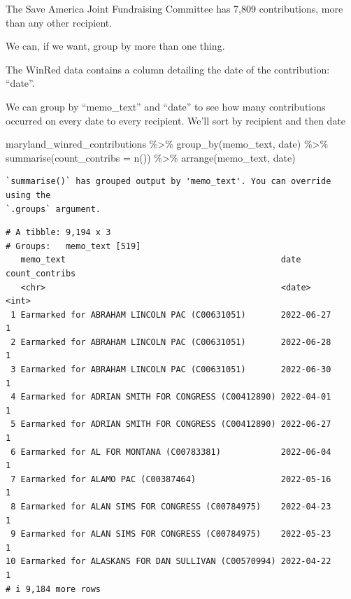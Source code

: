 \documentclass[
  letterpaper,
  DIV=11,
  numbers=noendperiod]{scrreprt}
\newenvironment{Shaded}{\begin{snugshade}}{\end{snugshade}}
\newcommand{\AttributeTok}[1]{\textcolor[rgb]{0.40,0.45,0.13}{#1}}
\newcommand{\FunctionTok}[1]{\textcolor[rgb]{0.28,0.35,0.67}{#1}}
\newcommand{\NormalTok}[1]{\textcolor[rgb]{0.00,0.23,0.31}{#1}}
\newcommand{\SpecialCharTok}[1]{\textcolor[rgb]{0.37,0.37,0.37}{#1}}
\begin{document}
The Save America Joint Fundraising Committee has 7,809 contributions,
more than any other recipient.

We can, if we want, group by more than one thing.

The WinRed data contains a column detailing the date of the
contribution: ``date''.

We can group by ``memo\_text'' and ``date'' to see how many
contributions occurred on every date to every recipient. We'll sort by
recipient and then date

\begin{Shaded}
\begin{Highlighting}[]
\NormalTok{maryland\_winred\_contributions }\SpecialCharTok{\%\textgreater{}\%}
  \FunctionTok{group\_by}\NormalTok{(memo\_text, date) }\SpecialCharTok{\%\textgreater{}\%}
  \FunctionTok{summarise}\NormalTok{(}\AttributeTok{count\_contribs =} \FunctionTok{n}\NormalTok{()) }\SpecialCharTok{\%\textgreater{}\%}
  \FunctionTok{arrange}\NormalTok{(memo\_text, date)}
\end{Highlighting}
\end{Shaded}

\begin{verbatim}
`summarise()` has grouped output by 'memo_text'. You can override using the
`.groups` argument.
\end{verbatim}

\begin{verbatim}
# A tibble: 9,194 x 3
# Groups:   memo_text [519]
   memo_text                                           date       count_contribs
   <chr>                                               <date>              <int>
 1 Earmarked for ABRAHAM LINCOLN PAC (C00631051)       2022-06-27              1
 2 Earmarked for ABRAHAM LINCOLN PAC (C00631051)       2022-06-28              1
 3 Earmarked for ABRAHAM LINCOLN PAC (C00631051)       2022-06-30              1
 4 Earmarked for ADRIAN SMITH FOR CONGRESS (C00412890) 2022-04-01              1
 5 Earmarked for ADRIAN SMITH FOR CONGRESS (C00412890) 2022-06-27              1
 6 Earmarked for AL FOR MONTANA (C00783381)            2022-06-04              1
 7 Earmarked for ALAMO PAC (C00387464)                 2022-05-16              1
 8 Earmarked for ALAN SIMS FOR CONGRESS (C00784975)    2022-04-23              1
 9 Earmarked for ALAN SIMS FOR CONGRESS (C00784975)    2022-05-23              1
10 Earmarked for ALASKANS FOR DAN SULLIVAN (C00570994) 2022-04-22              1
# i 9,184 more rows
\end{verbatim}
\end{document}
